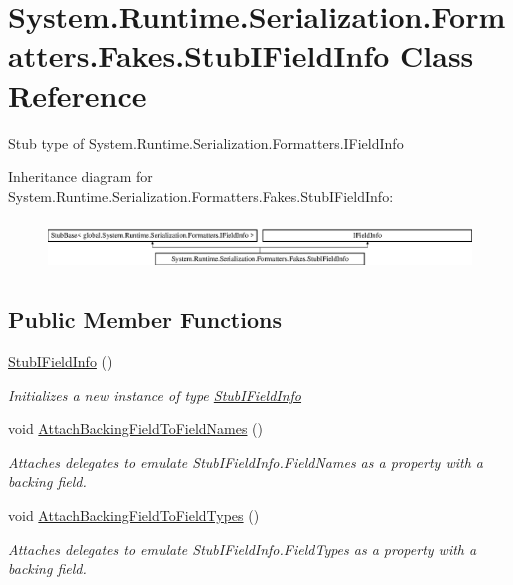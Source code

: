 \hypertarget{class_system_1_1_runtime_1_1_serialization_1_1_formatters_1_1_fakes_1_1_stub_i_field_info}{\section{System.\-Runtime.\-Serialization.\-Formatters.\-Fakes.\-Stub\-I\-Field\-Info Class Reference}
\label{class_system_1_1_runtime_1_1_serialization_1_1_formatters_1_1_fakes_1_1_stub_i_field_info}
}


Stub type of System.\-Runtime.\-Serialization.\-Formatters.\-I\-Field\-Info 


Inheritance diagram for System.\-Runtime.\-Serialization.\-Formatters.\-Fakes.\-Stub\-I\-Field\-Info\-:\begin{figure}[H]
\begin{center}
\leavevmode
\includegraphics[height=1.346154cm]{class_system_1_1_runtime_1_1_serialization_1_1_formatters_1_1_fakes_1_1_stub_i_field_info}
\end{center}
\end{figure}
\subsection*{Public Member Functions}
\begin{DoxyCompactItemize}
\item 
\hyperlink{class_system_1_1_runtime_1_1_serialization_1_1_formatters_1_1_fakes_1_1_stub_i_field_info_aafec8a609c994e65031c270d5732f8c6}{Stub\-I\-Field\-Info} ()
\begin{DoxyCompactList}\small\item\em Initializes a new instance of type \hyperlink{class_system_1_1_runtime_1_1_serialization_1_1_formatters_1_1_fakes_1_1_stub_i_field_info}{Stub\-I\-Field\-Info}\end{DoxyCompactList}\item 
void \hyperlink{class_system_1_1_runtime_1_1_serialization_1_1_formatters_1_1_fakes_1_1_stub_i_field_info_ac4f81c76dc3edc46ad5d617033d44522}{Attach\-Backing\-Field\-To\-Field\-Names} ()
\begin{DoxyCompactList}\small\item\em Attaches delegates to emulate Stub\-I\-Field\-Info.\-Field\-Names as a property with a backing field.\end{DoxyCompactList}\item 
void \hyperlink{class_system_1_1_runtime_1_1_serialization_1_1_formatters_1_1_fakes_1_1_stub_i_field_info_afdcea378b27c0bc6af6b286cce8417ce}{Attach\-Backing\-Field\-To\-Field\-Types} ()
\begin{DoxyCompactList}\small\item\em Attaches delegates to emulate Stub\-I\-Field\-Info.\-Field\-Types as a property with a backing field.\end{DoxyCompactList}\end{DoxyCompactItemize}
